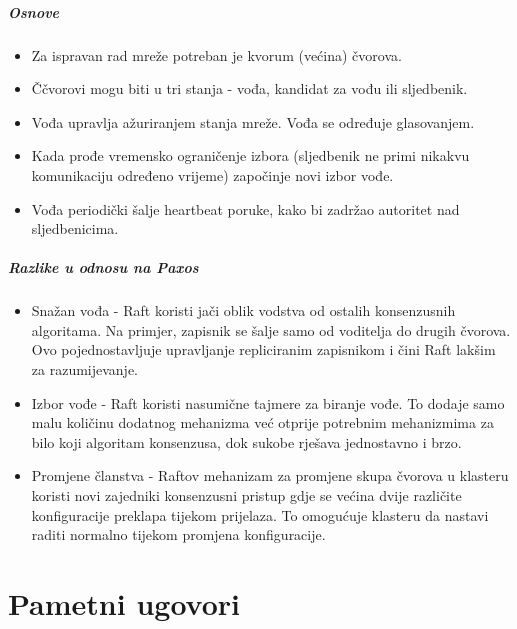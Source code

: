 \documentclass[times, utf8, diplomski]{fer}
\begin{document}
\subparagraph{Osnove}

\begin{itemize}

\item Za ispravan rad mreže potreban je kvorum (većina) čvorova.

\item Ččvorovi mogu biti u tri stanja - vođa, kandidat za vođu ili sljedbenik.

\item Vođa upravlja ažuriranjem stanja mreže. Vođa se određuje glasovanjem. 

\item Kada prođe vremensko ograničenje izbora (sljedbenik ne primi nikakvu komunikaciju određeno vrijeme) započinje novi izbor vođe.

\item Vođa periodički šalje heartbeat poruke, kako bi zadržao autoritet nad sljedbenicima.

\end{itemize}

\subparagraph{Razlike u odnosu na Paxos}

\begin{itemize}

\item Snažan vođa - Raft koristi jači oblik vodstva od ostalih konsenzusnih algoritama. Na primjer, zapisnik se šalje samo od voditelja do drugih čvorova. Ovo pojednostavljuje upravljanje repliciranim zapisnikom i čini Raft lakšim za razumijevanje.

\item Izbor vođe - Raft koristi nasumične tajmere za biranje vođe. To dodaje samo malu količinu dodatnog mehanizma već otprije potrebnim mehanizmima za bilo koji algoritam konsenzusa, dok sukobe rješava jednostavno i brzo.

\item Promjene članstva - Raftov mehanizam za promjene skupa čvorova u klasteru koristi novi zajedniki konsenzusni pristup gdje se većina dvije različite konfiguracije preklapa tijekom prijelaza. To omogućuje klasteru da nastavi raditi normalno tijekom promjena konfiguracije.

\end{itemize}

\section{Pametni ugovori}
\end{document}
